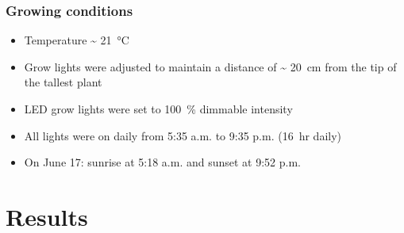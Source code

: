\documentclass[
    12pt,
    aspectratio=1610,
    b,
    bibliography=../bibliography.bib,
    link-citations]{beamer}
\begin{document}
    \begin{frame}
        \frametitle{Growing conditions}
        \begin{itemize}
            \item Temperature \~{} \qty[mode=text]{21}{\degreeCelsius}
            \item Grow lights were adjusted to maintain a distance of \~{} \qty[mode=text]{20}{\cm} from the tip of the tallest plant
            \item LED grow lights were set to \qty[mode=text]{100}{\percent} dimmable intensity
            \item All lights were on daily from 5:35 a.m. to 9:35 p.m. (\qty[mode=text]{16}{hr} daily)
            \item On June 17: sunrise at 5:18 a.m. and sunset at 9:52 p.m.
        \end{itemize}
    \end{frame}

    \section{Results}
\end{document}
